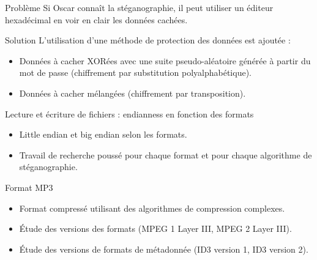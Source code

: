 \documentclass{beamer}
\begin{document}
  \begin{frame}
	\begin{alertblock}{Problème} 
	Si Oscar connaît la stéganographie, il peut utiliser un éditeur 
	hexadécimal en voir en clair les données cachées.
	\end{alertblock}
	
	\begin{exampleblock}{Solution} 
	L'utilisation d'une méthode de protection des données est ajoutée : 
	 \begin{itemize}
	 [circle]
	\item Données à cacher XORées avec une suite pseudo-aléatoire générée
	à partir du mot de passe (chiffrement par substitution polyalphabétique).
	\item Données à cacher mélangées (chiffrement par transposition).
	\end{itemize}
	\end{exampleblock}
  \end{frame}
  
   
  
  \begin{frame}
  
	\begin{block}{Lecture et écriture de fichiers : endianness en fonction des formats}
	\begin{itemize}
	[circle]

	\item Little endian et big endian selon les formats. 
	\item Travail de recherche poussé pour chaque format et pour chaque 
	algorithme de stéganographie.
	\end{itemize}
	\end{block}
		
	\begin{block}{Format MP3}
	\begin{itemize}
	[circle]
	\item Format compressé utilisant des algorithmes de compression complexes.
	\item Étude des versions des formats (MPEG 1 Layer III, MPEG 2 Layer III). 
	\item Étude des versions de formats de métadonnée (ID3 version 1, ID3 version 2). 
	\end{itemize}
	\end{block}
	
	\end{frame}
  
\end{document}
